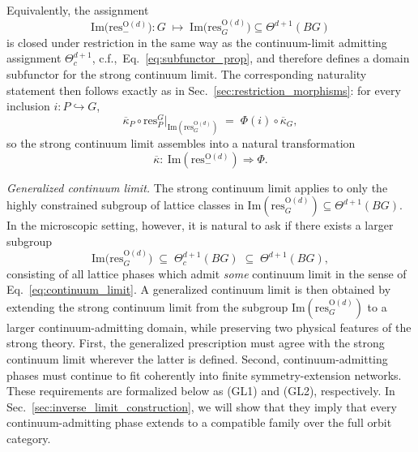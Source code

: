 \documentclass[aps,prx,reprint,superscriptaddress,twocolumn,amsmath,amssymb,amsfonts, nofootinbib]{revtex4-2}
\newcommand{\res}{\text{res}}
\theoremstyle{apsstyle}
\begin{document}
Equivalently, the assignment
\begin{equation}
    \mathrm{Im}\bigl(\res^{\mathrm{O}(d)}_{-}\bigr):G\;\longmapsto\;\mathrm{Im}\bigl(\res^{\mathrm{O}(d)}_{G}\bigr)\subseteq \Theta^{d+1}(BG)
    \label{eq:stong_CL_dom_functor}
\end{equation}
is closed under restriction in the same way as the continuum-limit admitting assignment $\Theta^{d+1}_c$, c.f.,~Eq.~\eqref{eq:subfunctor_prop}, and therefore defines
a domain subfunctor for the strong continuum limit. The corresponding naturality statement then follows exactly as in Sec.~\ref{sec:restriction_morphisms}: for every inclusion $i:P\hookrightarrow G$,
\begin{equation*}
    \overline{\kappa}_{P}\circ
    \res^{G}_{P}\big|_{\mathrm{Im}(\res^{\mathrm{O}(d)}_{G})}
    \;=\;
    \Phi(i)\circ \overline{\kappa}_{G},
\end{equation*}
so the strong continuum limit assembles into a natural transformation
\begin{equation*}
    \overline{\kappa}:\ \mathrm{Im}(\res^{\mathrm{O}(d)}_{-})\Rightarrow \Phi.
\end{equation*}


\bigskip

\noindent \textit{Generalized continuum limit.} The strong continuum limit applies to only the highly constrained subgroup of lattice classes in
$\mathrm{Im}(\res^{\mathrm{O}(d)}_{G})\subseteq\Theta^{d+1}(BG)$. In the microscopic setting, however, it is natural to ask if there exists a larger subgroup
\begin{equation*}
    \mathrm{Im}\bigl(\res^{\mathrm{O}(d)}_{G}\bigr)
    \;\subseteq\;
    \Theta^{d+1}_{c}(BG)
    \;\subseteq\;
    \Theta^{d+1}(BG),
\end{equation*}
consisting of all lattice phases which admit \emph{some} continuum limit in the sense of Eq.~\ref{eq:continuum_limit}. A generalized continuum limit is then obtained by extending the strong continuum limit from the subgroup $\mathrm{Im}(\res^{\mathrm{O}(d)}_{G})$ to a larger continuum-admitting domain, while preserving two physical features of the strong theory. First, the generalized prescription must agree with the strong continuum limit wherever the latter is defined. Second, continuum-admitting phases must continue to fit coherently into finite symmetry-extension networks. These requirements are formalized below as (GL1) and (GL2), respectively. In Sec.~\ref{sec:inverse_limit_construction}, we will show that they imply that every continuum-admitting phase extends to a compatible family over the full orbit category.
\end{document}

